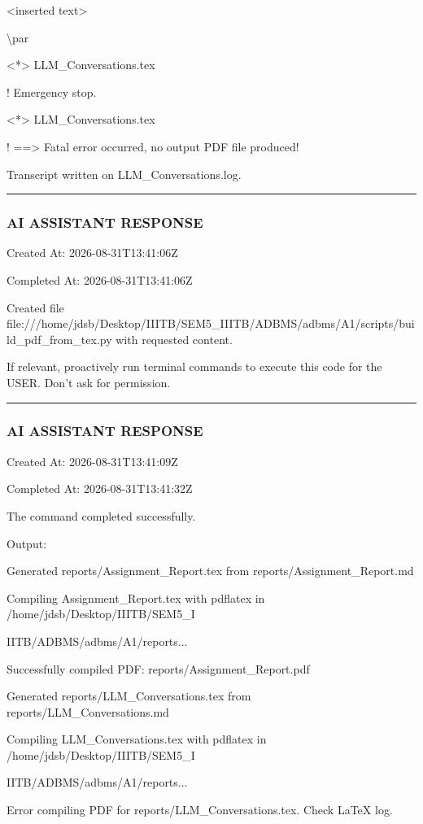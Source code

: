 \documentclass[11pt,a4paper]{article}
\begin{document}
{{<inserted text>

\textbackslash{}par

<*> LLM\_Conversations.tex


! Emergency stop.

<*> LLM\_Conversations.tex


!  ==> Fatal error occurred, no output PDF file produced!

Transcript written on LLM\_Conversations.log.


\hrule

\subsubsection{AI ASSISTANT RESPONSE}

Created At: 2026-08-31T13:41:06Z

Completed At: 2026-08-31T13:41:06Z

Created file file:///home/jdsb/Desktop/IIITB/SEM5\_IIITB/ADBMS/adbms/A1/scripts/build\_pdf\_from\_tex.py with requested content.

If relevant, proactively run terminal commands to execute this code for the USER. Don't ask for permission.


\hrule

\subsubsection{AI ASSISTANT RESPONSE}

Created At: 2026-08-31T13:41:09Z

Completed At: 2026-08-31T13:41:32Z


The command completed successfully.

Output:

Generated reports/Assignment\_Report.tex from reports/Assignment\_Report.md

Compiling Assignment\_Report.tex with pdflatex in /home/jdsb/Desktop/IIITB/SEM5\_I

IITB/ADBMS/adbms/A1/reports...

Successfully compiled PDF: reports/Assignment\_Report.pdf

Generated reports/LLM\_Conversations.tex from reports/LLM\_Conversations.md

Compiling LLM\_Conversations.tex with pdflatex in /home/jdsb/Desktop/IIITB/SEM5\_I

IITB/ADBMS/adbms/A1/reports...

Error compiling PDF for reports/LLM\_Conversations.tex. Check LaTeX log.

}}
\end{document}
